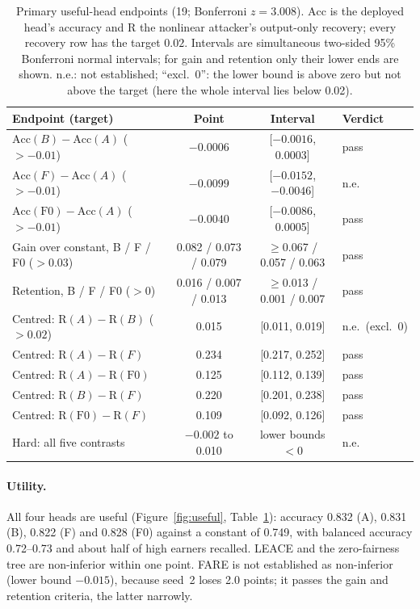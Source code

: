 \documentclass[10pt]{article}
\newcommand{\Rec}{\mathrm{R}}
\newcommand{\Acc}{\mathrm{Acc}}
\begin{document}
\begin{table}[!tbp]
\centering\small
\caption{Primary useful-head endpoints (19; Bonferroni $z=3.008$). $\Acc$ is the deployed head's accuracy and $\Rec$
the nonlinear attacker's output-only recovery; every recovery row has the target $0.02$. Intervals are simultaneous
two-sided 95\% Bonferroni normal intervals; for gain and retention only their lower ends are shown. n.e.: not
established; ``excl.\ 0'': the lower bound is above zero but not above the target (here the whole interval lies below
0.02).}\label{tab:useful}
\begin{tabular}{@{}lccl@{}}
\toprule
Endpoint (target) & Point & Interval & Verdict\\
\midrule
$\Acc(B)-\Acc(A)$ ($>-0.01$) & $-0.0006$ & [$-0.0016$, 0.0003] & pass\\
$\Acc(F)-\Acc(A)$ ($>-0.01$) & $-0.0099$ & [$-0.0152$, $-0.0046$] & n.e.\\
$\Acc(\mathrm{F0})-\Acc(A)$ ($>-0.01$) & $-0.0040$ & [$-0.0086$, 0.0005] & pass\\
Gain over constant, B / F / F0 ($>0.03$) & 0.082 / 0.073 / 0.079 & $\ge$0.067 / 0.057 / 0.063 & pass\\
Retention, B / F / F0 ($>0$) & 0.016 / 0.007 / 0.013 & $\ge$0.013 / 0.001 / 0.007 & pass\\
\midrule
Centred: $\Rec(A)-\Rec(B)$ ($>0.02$) & 0.015 & [0.011, 0.019] & n.e.\ (excl.\ 0)\\
Centred: $\Rec(A)-\Rec(F)$ & 0.234 & [0.217, 0.252] & pass\\
Centred: $\Rec(A)-\Rec(\mathrm{F0})$ & 0.125 & [0.112, 0.139] & pass\\
Centred: $\Rec(B)-\Rec(F)$ & 0.220 & [0.201, 0.238] & pass\\
Centred: $\Rec(\mathrm{F0})-\Rec(F)$ & 0.109 & [0.092, 0.126] & pass\\
Hard: all five contrasts & $-0.002$ to 0.010 & lower bounds $<0$ & n.e.\\
\bottomrule
\end{tabular}
\end{table}

\paragraph{Utility.} All four heads are useful (Figure~\ref{fig:useful}, Table~\ref{tab:useful}): accuracy 0.832 (A),
0.831 (B), 0.822 (F) and 0.828 (F0) against a constant of 0.749, with balanced accuracy 0.72--0.73 and about half of high
earners recalled. LEACE and the zero-fairness tree are non-inferior within one point. FARE is not established as
non-inferior (lower bound $-0.015$), because seed~2 loses 2.0 points; it passes the gain and retention criteria, the
latter narrowly.
\end{document}
